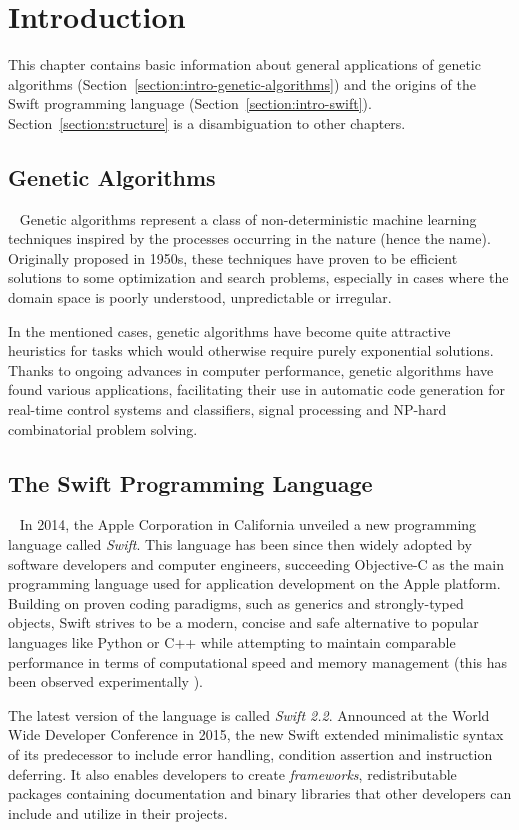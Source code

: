 \chapter{Introduction}
This chapter contains basic information about general applications of genetic algorithms (Section~\ref{section:intro-genetic-algorithms}) and the origins of the Swift programming language (Section~\ref{section:intro-swift}). Section~\ref{section:structure} is a disambiguation to other chapters.

\section{Genetic Algorithms}~\label{section:intro-genetic-algorithms}
Genetic algorithms represent a class of non-deterministic machine learning techniques inspired by the processes occurring in the nature (hence the name). Originally proposed in 1950s, these techniques have proven to be efficient solutions to some optimization and search problems, especially in cases where the domain space is poorly understood, unpredictable or irregular.

In the mentioned cases, genetic algorithms have become quite attractive heuristics for tasks which would otherwise require purely exponential solutions. Thanks to ongoing advances in computer performance, genetic algorithms have found various applications, facilitating their use in automatic code generation for real-time control systems and classifiers, signal processing and NP-hard combinatorial problem solving.

\section{The Swift Programming Language}~\label{section:intro-swift}
In 2014, the Apple Corporation in California unveiled a new programming language called \textit{Swift}. \cite{SwiftReference} This language has been since then widely adopted by software developers and computer engineers, succeeding Objective-C as the main programming language used for application development on the Apple platform. Building on proven coding paradigms, such as generics and strongly-typed objects, Swift strives to be a modern, concise and safe alternative to popular languages like Python or C++ while attempting to maintain comparable performance in terms of computational speed and memory management (this has been observed experimentally \cite{PrimateLabsBenchmark}).

The latest version of the language is called \textit{Swift 2.2}. Announced at the World Wide Developer Conference in 2015, the new Swift extended minimalistic syntax of its predecessor to include error handling, condition assertion and instruction deferring. It also enables developers to create \textit{frameworks}, redistributable packages containing documentation and binary libraries that other developers can include and utilize in their projects.

